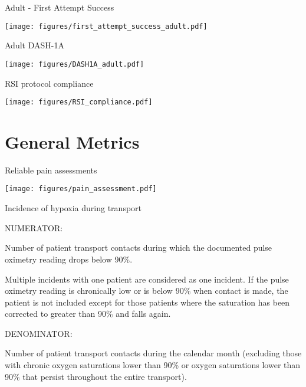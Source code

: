 \documentclass[ignorenonframetext,]{beamer}
\makeatletter
\def\maxwidth{\ifdim\Gin@nat@width>\linewidth\linewidth\else\Gin@nat@width\fi}
\def\maxheight{\ifdim\Gin@nat@height>\textheight0.8\textheight\else\Gin@nat@height\fi}
\renewcommand{\includegraphics}[2][]{%
    \Oldincludegraphics[#1,width=\maxwidth,height=\maxheight,keepaspectratio]{#2}}
\makeatother
\begin{document}
\begin{frame}{Adult - First Attempt Success}

\texttt{[image: figures/first\_attempt\_success\_adult.pdf]}

\end{frame}

\begin{frame}{Adult DASH-1A}

\texttt{[image: figures/DASH1A\_adult.pdf]}

\end{frame}

\begin{frame}{RSI protocol compliance}

\texttt{[image: figures/RSI\_compliance.pdf]}

\end{frame}

\section{General Metrics}\label{general-metrics}

\begin{frame}{Reliable pain assessments}

\texttt{[image: figures/pain\_assessment.pdf]}

\end{frame}

\begin{frame}{Incidence of hypoxia during transport}

\begin{block}{NUMERATOR:}

Number of patient transport contacts during which the documented pulse
oximetry reading drops below 90\%.

Multiple incidents with one patient are considered as one incident. If
the pulse oximetry reading is chronically low or is below 90\% when
contact is made, the patient is not included except for those patients
where the saturation has been corrected to greater than 90\% and falls
again.

\end{block}

\begin{block}{DENOMINATOR:}

Number of patient transport contacts during the calendar month
(excluding those with chronic oxygen saturations lower than 90\% or
oxygen saturations lower than 90\% that persist throughout the entire
transport).

\end{block}

\end{frame}
\end{document}
